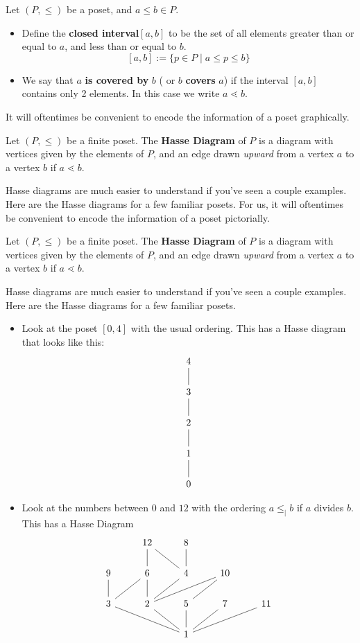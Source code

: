 \begin{definition}
	Let $(P,  \leq)$ be a poset,  and $a\leq b\in P$. 
	\begin{itemize}
		\item Define the \textbf{closed interval}$[a, b]$ to be the set of all elements greater than or equal to $a$,  and less than or equal to $b$. 
		\[ [a, b]:=\{p\in P\;|\;a\leq p\leq b\}\]
		\item We say that $a$ \textbf{is covered by} $b$ ( or $b$ \textbf{covers} $a$) if the interval $[a, b]$ contains only 2 elements. In this case we write $a\lessdot b$.
	\end{itemize}
\end{definition}
It will oftentimes be convenient to encode the information of a poset graphically. 
\begin{definition}
	Let $(P,  \leq)$ be a finite poset. The \textbf{Hasse Diagram} of $P$ is a diagram with vertices given by the elements of $P$,  and an edge drawn \emph{upward} from a vertex $a$ to a vertex $b$ if $a\lessdot b$.
\end{definition}
Hasse diagrams are much easier to understand if you've seen a couple examples. Here are the Hasse diagrams for a few familiar posets.
For us,  it will oftentimes be convenient to encode the information of a poset pictorially. 
\begin{definition}
	Let $(P,  \leq)$ be a finite poset. The \textbf{Hasse Diagram} of $P$ is a diagram with vertices given by the elements of $P$,  and an edge drawn \emph{upward} from a vertex $a$ to a vertex $b$ if $a\lessdot b$.
\end{definition}
Hasse diagrams are much easier to understand if you've seen a couple examples. Here are the Hasse diagrams for a few familiar posets.
\begin{example}
	\begin{itemize}
		\item Look at the poset $[0, 4]$ with the usual ordering. This has a Hasse diagram that looks like this:
		\[\begin{tikzcd}
		  	4\arrow[dash]{d} \\3\arrow[dash]{d} \\2\arrow[dash]{d} \\1\arrow[dash]{d} \\0
		  \end{tikzcd}\]
		\item Look at the numbers between $0$ and $12$ with the ordering $a\leq_|b$ if $a$ divides $b$. This has a Hasse Diagram
		\[
			\begin{tikzcd}
				\;& 12& 8\\
				9&6 \arrow[dash]{u}&4\arrow[dash]{ul} \arrow[dash]{u} & 10\\
				3\arrow[dash]{u} \arrow[dash]{ur} &2 \arrow[dash]{ur} \arrow[dash]{u} \arrow[dash]{rru} &5 \arrow[dash]{ru} &7&11\\
				&&1 \arrow[dash]{ull} \arrow[dash]{ul} \arrow[dash]{u} \arrow[dash]{ur} \arrow[dash]{urr}
			\end{tikzcd}
		\]
		\end{itemize}
\end{example}
